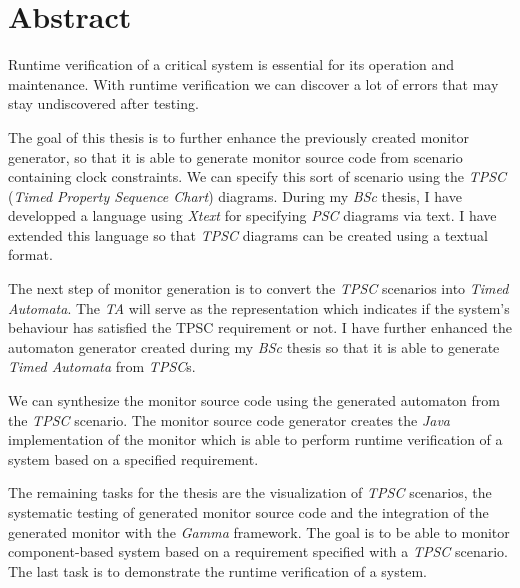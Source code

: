 \vfill
\selectenglish


\chapter*{Abstract}

Runtime verification of a critical system is essential for its operation and maintenance.
With runtime verification we can discover a lot of errors that may stay undiscovered after testing.

The goal of this thesis is to further enhance the previously created monitor generator, so that it is able to generate monitor source code from scenario containing clock constraints.
We can specify this sort of scenario using the \textit{TPSC} (\textit{Timed Property Sequence Chart}) diagrams.
During my \textit{BSc} thesis, I have developped a language using \textit{Xtext} for specifying \textit{PSC} diagrams via text.
I have extended this language so that \textit{TPSC} diagrams can be created using a textual format.

The next step of monitor generation is to convert the \textit{TPSC} scenarios into \textit{Timed Automata}.
The \textit{TA} will serve as the representation which indicates if the system's behaviour has satisfied the TPSC requirement or not.
I have further enhanced the automaton generator created during my \textit{BSc} thesis so that it is able to generate \textit{Timed Automata} from \textit{TPSC}s.

We can synthesize the monitor source code using the generated automaton from the \textit{TPSC} scenario.
The monitor source code generator creates the \textit{Java} implementation of the monitor which is able to perform runtime verification of a system based on a specified requirement.

The remaining tasks for the thesis are the visualization of \textit{TPSC} scenarios, the systematic testing of generated monitor source code and the integration of the generated monitor with the \textit{Gamma} framework.
The goal is to be able to monitor component-based system based on a requirement specified with a \textit{TPSC} scenario.
The last task is to demonstrate the runtime verification of a system.

\vfill
\selectthesislanguage

\setcounter{romanPage}{\value{page}}
